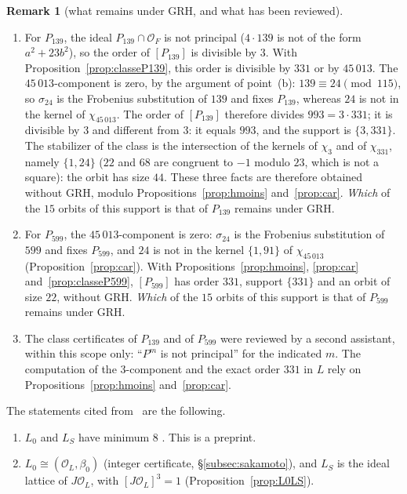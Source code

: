 \documentclass[11pt,a4paper]{amsart}
\theoremstyle{plain}
\theoremstyle{definition}
\newtheorem{remark}[theorem]{Remark}
\numberwithin{equation}{section}
\newcommand{\OO}{\mathcal{O}}
\newcommand{\Lz}{L_{0}}
\newcommand{\LS}{L_{S}}
\begin{document}
\begin{remark}[what remains under GRH, and what has been reviewed]\label{rem:classes}
\begin{enumerate}[label=\textup{(\alph*)}]
\item For $P_{139}$, the ideal $P_{139}\cap\OO_F$ is not principal ($4\cdot139$ is not of the form $a^2+23b^2$), so the order of $[P_{139}]$ is divisible by $3$. With Proposition~\ref{prop:classeP139}, this order is divisible by $331$ or by $45\,013$. The $45\,013$-component is zero, by the argument of point~(b): $139\equiv24\pmod{115}$, so $\sigma_{24}$ is the Frobenius substitution of $139$ and fixes $P_{139}$, whereas $24$ is not in the kernel of $\chi_{45\,013}$. The order of $[P_{139}]$ therefore divides $993=3\cdot331$; it is divisible by $3$ and different from $3$: it equals $993$, and the support is $\{3,331\}$. The stabilizer of the class is the intersection of the kernels of $\chi_3$ and of $\chi_{331}$, namely $\{1,24\}$ ($22$ and $68$ are congruent to $-1$ modulo $23$, which is not a square): the orbit has size $44$. These three facts are therefore obtained without GRH, modulo Propositions~\ref{prop:hmoins} and~\ref{prop:car}. \emph{Which} of the $15$ orbits of this support is that of $P_{139}$ remains under GRH.
\item For $P_{599}$, the $45\,013$-component is zero: $\sigma_{24}$ is the Frobenius substitution of $599$ and fixes $P_{599}$, and $24$ is not in the kernel $\{1,91\}$ of $\chi_{45\,013}$ (Proposition~\ref{prop:car}). With Propositions~\ref{prop:hmoins}, \ref{prop:car} and~\ref{prop:classeP599}, $[P_{599}]$ has order $331$, support $\{331\}$ and an orbit of size $22$, without GRH. \emph{Which} of the $15$ orbits of this support is that of $P_{599}$ remains under GRH.
\item The class certificates of $P_{139}$ and of $P_{599}$ were reviewed by a second assistant, within this scope only: ``$P^m$ is not principal'' for the indicated $m$. The computation of the $3$-component and the exact order $331$ in $L$ rely on Propositions~\ref{prop:hmoins} and~\ref{prop:car}.
\end{enumerate}
\end{remark}

The statements cited from~\cite{Sak26} are the following.
\begin{enumerate}[label=\textup{(S\arabic*)}]
\item $\Lz$ and $\LS$ have minimum $8$ \cite[\S5, Prop.~5.5]{Sak26}. This is a preprint.
\item $\Lz\cong(\OO_L,\beta_0)$ (integer certificate, \S\ref{subsec:sakamoto}), and $\LS$ is the ideal lattice of $J\OO_L$, with $[J\OO_L]^3=1$ (Proposition~\ref{prop:L0LS}).
\end{enumerate}
\end{document}
